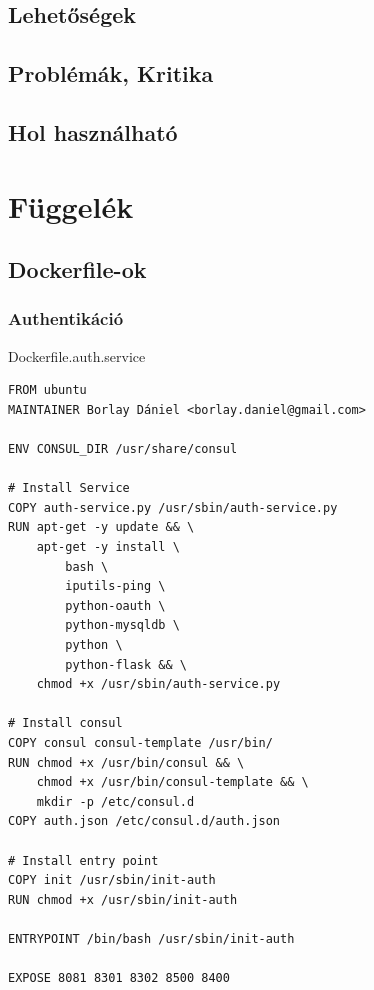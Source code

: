 \documentclass[11pt,magyar,a4paper,twoside,]{report}
\begin{document}
\section{Lehetőségek}\label{lehetux151suxe9gek}

\section{Problémák, Kritika}\label{probluxe9muxe1k-kritika}

\section{Hol használható}\label{hol-hasznuxe1lhatuxf3}

\listoftables
\listoffigures




\appendix

\chapter{Függelék}\label{fuxfcggeluxe9k}

\section{\texorpdfstring{Dockerfile-ok\label{appendix-dockerfile}}{Dockerfile-ok}}\label{dockerfile-ok}

\subsection{Authentikáció}\label{authentikuxe1ciuxf3}

Dockerfile.auth.service

\begin{verbatim}
FROM ubuntu
MAINTAINER Borlay Dániel <borlay.daniel@gmail.com>

ENV CONSUL_DIR /usr/share/consul

# Install Service
COPY auth-service.py /usr/sbin/auth-service.py
RUN apt-get -y update && \
    apt-get -y install \
        bash \
        iputils-ping \
        python-oauth \
        python-mysqldb \
        python \
        python-flask && \
    chmod +x /usr/sbin/auth-service.py

# Install consul
COPY consul consul-template /usr/bin/
RUN chmod +x /usr/bin/consul && \
    chmod +x /usr/bin/consul-template && \
    mkdir -p /etc/consul.d
COPY auth.json /etc/consul.d/auth.json

# Install entry point
COPY init /usr/sbin/init-auth
RUN chmod +x /usr/sbin/init-auth

ENTRYPOINT /bin/bash /usr/sbin/init-auth

EXPOSE 8081 8301 8302 8500 8400
\end{verbatim}
\end{document}
